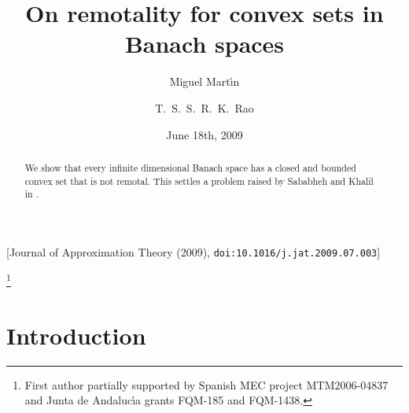 \documentclass[11pt,a4paper]{amsart}
\theoremstyle{plain}
\theoremstyle{definition}
\begin{document}
\begin{center}\small
[Journal of Approximation Theory (2009), \texttt{doi:10.1016/j.jat.2009.07.003}]
\end{center}


\title{On remotality for convex sets in Banach spaces}

\author[Mart\'{\i}n] {Miguel Mart\'{\i}n}
\address[M.~Mart\'{\i}n] {Departamento de An\'{a}lisis Matem\'{a}tico\\
Facultad de Ciencias \\Campus Universitario de Fuentenueva\\
Universidad de Granada \\ E-18071  Granada, Spain,
\textit{E-mail~:} \textit{mmartins@ugr.es}}

\author[Rao]{T.~S.~S.~R.~K.~Rao}
\address[T.~S.~S.~R.~K.~Rao]{Stat--Math Unit\\
Indian Statistical Institute\\
R.~V.~College P.O.\\
Bangalore 560059, India, \textit{E-mail~:}
\textit{tss@isibang.ac.in}}

\thanks{First author partially supported by Spanish MEC project MTM2006-04837 and Junta de
Andaluc\'{\i}a grants FQM-185 and FQM-1438.}


\date{June 18th, 2009}


\maketitle



\begin{abstract} We show that every infinite dimensional Banach space has
a closed and bounded convex set that is not remotal. This settles a
problem raised by Sababheh and Khalil in \cite{S}.
\end{abstract}






\section{Introduction}
\end{document}
